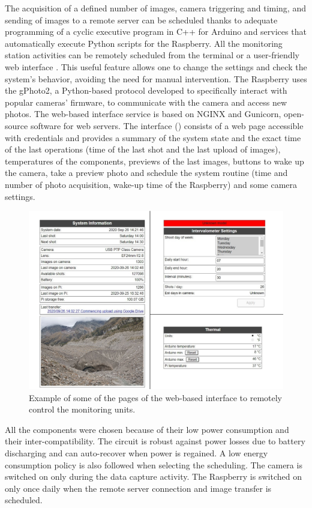 The acquisition of a defined number of images, camera triggering and timing, and sending of images to a remote server can be scheduled thanks to adequate programming of a cyclic executive program in C++ for Arduino and services that automatically execute Python scripts for the Raspberry.
All the monitoring station activities can be remotely scheduled from the terminal or a user-friendly web interface \citep{greig}. 
This useful feature allows one to change the settings and check the system's behavior, avoiding the need for manual intervention. 
The Raspberry uses the gPhoto2, a Python-based protocol developed to specifically interact with popular cameras’ firmware, to communicate with the camera and access new photos. 
The web-based interface service is based on NGINX and Gunicorn, open-source software for web servers. 
The interface () consists of a web page accessible with credentials and provides a summary of the system state and the exact time of the last operations (time of the last shot and the last upload of images), temperatures of the components, previews of the last images, buttons to wake up the camera, take a preview photo and schedule the system routine (time and number of photo acquisition, wake-up time of the Raspberry) and some camera settings.

\begin{figure}[ht!]
  \centering
  \includegraphics[width=1\textwidth]{web_interface.png}
  \caption{Example of some of the pages of the web-based interface to remotely control
    the monitoring units.}
  \label{fig:4:web-interface}
\end{figure}

All the components were chosen because of their low power consumption and their inter-compatibility. 
The circuit is robust against power losses due to battery discharging and can auto-recover when power is regained. 
A low energy consumption policy is also followed when selecting the scheduling. 
The camera is switched on only during the data capture activity. 
The Raspberry is switched on only once daily when the remote server connection and image transfer is scheduled.

